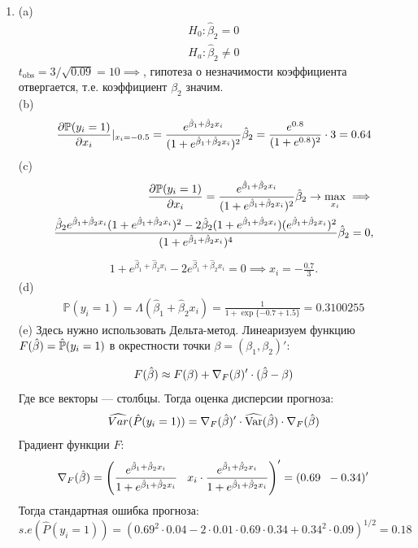\documentclass[12pt, a4paper]{article}\usepackage[]{graphicx}\usepackage[]{color}
\begin{document}
\begin{enumerate}
\item
(a)
\begin{eqnarray}
H_0: \hat\beta_2 = 0 \\
H_a: \hat\beta_2 \neq 0
\end{eqnarray}
$t_{\mathrm{obs}} = 3 / \sqrt{0.09} = 10 \implies$, гипотеза о незначимости коэффициента отвергается, т.е. коэффициент $\beta_2$ значим. \\
(b)
\begin{eqnarray}
 \frac{\partial \mathbb{P}(y_i = 1)}{\partial x_i} |_{x_i = -0.5} = \frac {e^{\hat\beta_1 + \hat\beta_2 x_i}}{(1+ e^{\hat\beta_1 + \hat\beta_2 x_i})^2}\hat{\beta}_2 = \frac{e^{0.8}}{(1+e^{0.8})^2}\cdot3 = 0.64
\end{eqnarray}
(c)
\begin{eqnarray}
 \frac{\partial \mathbb{P}(y_i = 1)}{\partial x_i} = \frac {e^{\hat\beta_1 + \hat\beta_2 x_i}}{(1+ e^{\hat\beta_1 + \hat\beta_2 x_i})^2}\hat{\beta}_2 \to \max_{x_i} \implies \\
 \frac{\hat\beta_2 e^{\hat\beta_1 + \hat\beta_2 x_i} (1+ e^{\hat\beta_1 + \hat\beta_2 x_i})^2 - 2\hat\beta_2(1+ e^{\hat\beta_1 + \hat\beta_2 x_i})(e^{\hat\beta_1 + \hat\beta_2x_i})^2}{(1+ e^{\hat\beta_1 + \hat\beta_2 x_i})^4}\hat{\beta}_2 = 0,
\end{eqnarray}
\begin{eqnarray}
1 + e^{\hat\beta_1 + \hat\beta_2 x_i} - 2e^{\hat\beta_1 + \hat\beta_2 x_i} = 0 \implies x_i = -\frac{0.7}{3}.
\end{eqnarray}
(d)
\begin{eqnarray}
\mathbb{P}(y_i =1) = \Lambda(\hat\beta_1 + \hat\beta_2 x_i) = \frac 1{1 + \exp\{-0.7 + 1.5\}} = 0.3100255
\end{eqnarray}
(e) Здесь нужно использовать Дельта-метод. Линеаризуем функцию $F(\hat{\beta}) = \hat{\mathbb{P}}(y_i = 1) $ в окрестности точки $\beta = (\beta_1, \beta_2)'$:

\[
F(\hat{\beta}) \approx F(\beta) +   \nabla_F(\beta)'   \cdot (\hat{\beta} - \beta )
\]
Где все векторы — столбцы. Тогда оценка дисперсии прогноза:
\[
\widehat{Var}(\hat{P}(y_i = 1)) = \nabla_F(\hat{\beta})' \cdot \widehat{\operatorname{Var}}(\hat{\beta}) \cdot \nabla_F(\hat{\beta})
\]
Градиент функции $F$:
\[
\nabla_F(\hat{\beta}) = \left( \frac{e^{\hat{\beta}_1 + \hat{\beta}_2 x_i}}{1 + e^{\hat{\beta}_1 + \hat{\beta}_2 x_i}} \hspace{3mm} x_i\cdot \frac{e^{\hat{\beta}_1 + \hat{\beta}_2 x_i}}{1 + e^{\hat{\beta}_1 + \hat{\beta}_2 x_i}}\right)' = (0.69 \hspace{2mm}-0.34)'
\]
Тогда стандартная ошибка прогноза:
\[
s.e(\hat{P}(y_i = 1)) = ( 0.69^2 \cdot 0.04 - 2\cdot0.01\cdot0.69\cdot0.34 + 0.34^2 \cdot 0.09 )^{1/2} =  0.18
\]



\end{enumerate}
\end{document}
